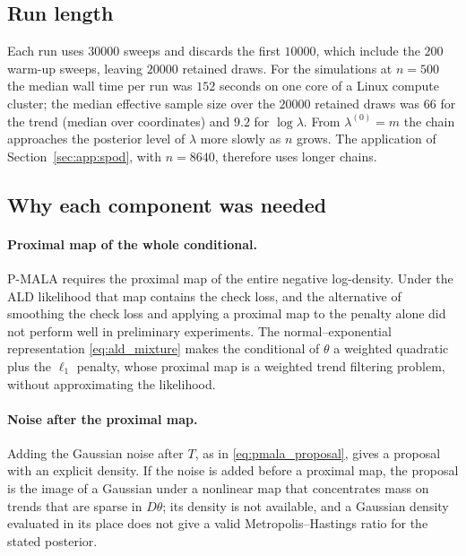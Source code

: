 \subsection{Run length}
\label{app:pmala:runlength}

Each run uses $30000$ sweeps and discards the first $10000$, which include the $200$ warm-up sweeps, leaving $20000$ retained draws. For the simulations at $n = 500$ the median wall time per run was $152$ seconds on one core of a Linux compute cluster; the median effective sample size over the $20000$ retained draws was $66$ for the trend (median over coordinates) and $9.2$ for $\log\lambda$. From $\lambda^{(0)} = m$ the chain approaches the posterior level of $\lambda$ more slowly as $n$ grows. The application of Section~\ref{sec:app:spod}, with $n = 8640$, therefore uses longer chains.

\subsection{Why each component was needed}
\label{app:pmala:changes}

\paragraph{Proximal map of the whole conditional.} P-MALA requires the proximal map of the entire negative log-density. Under the ALD likelihood that map contains the check loss, and the alternative of smoothing the check loss and applying a proximal map to the penalty alone did not perform well in preliminary experiments. The normal--exponential representation \eqref{eq:ald_mixture} makes the conditional of $\theta$ a weighted quadratic plus the $\ell_1$ penalty, whose proximal map is a weighted trend filtering problem, without approximating the likelihood.

\paragraph{Noise after the proximal map.} Adding the Gaussian noise after $T$, as in \eqref{eq:pmala_proposal}, gives a proposal with an explicit density. If the noise is added before a proximal map, the proposal is the image of a Gaussian under a nonlinear map that concentrates mass on trends that are sparse in $D\theta$; its density is not available, and a Gaussian density evaluated in its place does not give a valid Metropolis--Hastings ratio for the stated posterior.

